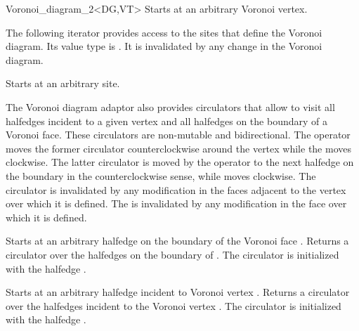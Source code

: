 \begin{ccRefClass}{Voronoi_diagram_2<DG,VT>}
{Starts at an arbitrary Voronoi vertex.}
\ccGlue
{}

The following iterator provides access to the sites that define
the Voronoi diagram. Its value type is . It is
invalidated by any change in the Voronoi diagram.

{Starts at an arbitrary site.}
\ccGlue
{}



The Voronoi diagram adaptor also provides circulators that allow to visit 
all halfedges incident to a given vertex and all halfedges on the
boundary of a Voronoi face. These circulators are non-mutable and
bidirectional.
The operator  moves the former circulator counterclockwise
around the vertex while the  moves clockwise.
The latter circulator is moved by the operator  to the
next halfedge on the boundary in the counterclockwise sense, while
 moves clockwise.
The  circulator is
invalidated by any modification in the faces adjacent to the vertex
over which it is defined. The  is
invalidated by any modification in the face over which it is defined.

\ccThreeToTwo
%
{Starts at an arbitrary halfedge on the boundary of the Voronoi face
  .}
\ccGlue
{} 
{Returns a circulator over the halfedges on the boundary of
  . The circulator is initialized with the halfedge .
  }

\ccThreeToTwo
%
{Starts at an arbitrary halfedge incident to Voronoi vertex .}
\ccGlue
{}
{Returns a circulator over the halfedges incident to the Voronoi
  vertex . The circulator is initialized with the halfedge
  .
  }



\end{ccRefClass}
